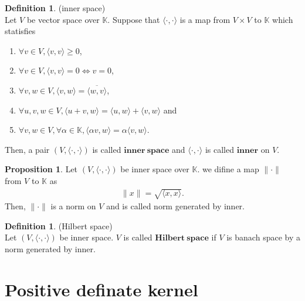 \documentclass[11pt, a4paper, english, dvipdfmx]{jsarticle}
\theoremstyle{definition}
\newtheorem{Definition+}[Axiom+]{Definition}
\newtheorem{Proposition+}[Axiom+]{Proposition}
\def\inner<#1>{\langle #1 \rangle}
\newcommand{\K}{\mathbb{K}}
\begin{document}
\begin{Definition+}(inner space)\\
    Let $V$ be vector space over $\K$. Suppose that $\inner<\cdot, \cdot>$ is a map from $V\times V$ to $\K$
    which statisfies
    \begin{enumerate}
        \item $\forall v\in V, \inner<v, v>\geq 0$,
        \item $\forall v\in V, \inner<v, v> = 0\iff v = 0$,
        \item $\forall v, w\in V, \inner<v, w> = \overline{\inner<w, v>}$,
        \item $\forall u, v, w\in V, \inner<u + v, w> = \inner<u, w> + \inner<v, w>$ and
        \item $\forall v, w\in V, \forall\alpha\in\K, \inner<\alpha v, w> = \alpha\inner<v, w>$.
    \end{enumerate}
    Then, a pair $(V, \inner<\cdot, \cdot>)$ is called $\mathbf{inner~space}$ and $\inner<\cdot, \cdot>$ is called $\mathbf{inner}$ on $V$.
\end{Definition+}

\begin{Proposition+}
    Let $(V, \inner<\cdot, \cdot>)$ be inner space over $\K$.
    we difine a map $\|\cdot\|$ from $V$ to $\K$ as
    \begin{align*}
        \|x\| = \sqrt{\inner<x, x>}.
    \end{align*}
    Then, $\|\cdot\|$ is a norm on $V$ and is called norm generated by inner. 
\end{Proposition+}
\begin{Definition+}(Hilbert space)\\
    Let $(V, \inner<\cdot, \cdot>)$ be inner space.
    $V$ is called $\mathbf{Hilbert~space}$ if $V$ is banach space by a norm generated by inner.
\end{Definition+}

\section{Positive definate kernel}
\end{document}
